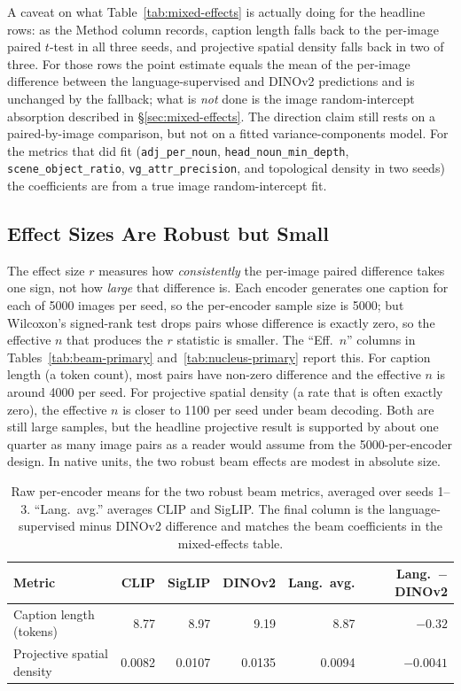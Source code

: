 \documentclass[11pt]{article}
\newcommand{\code}[1]{\texttt{#1}}
\begin{document}
A caveat on what Table~\ref{tab:mixed-effects} is actually doing for the
headline rows: as the Method column records, caption length falls back to the
per-image paired \(t\)-test in all three seeds, and projective spatial density
falls back in two of three. For those rows the point estimate equals the mean
of the per-image difference between the language-supervised and DINOv2
predictions and is unchanged by the fallback; what is \emph{not} done is the
image random-intercept absorption described in \S\ref{sec:mixed-effects}. The
direction claim still rests on a paired-by-image comparison, but not on a
fitted variance-components model. For the metrics that did fit
(\code{adj\_per\_noun}, \code{head\_noun\_min\_depth},
\code{scene\_object\_ratio}, \code{vg\_attr\_precision}, and topological
density in two seeds) the coefficients are from a true image random-intercept
fit.

\subsection{Effect Sizes Are Robust but Small}
\label{sec:magnitudes}

The effect size \(r\) measures how \emph{consistently} the per-image paired
difference takes one sign, not how \emph{large} that difference is. Each
encoder generates one caption for each of 5000 images per seed, so the
per-encoder sample size is 5000; but Wilcoxon's signed-rank test drops pairs
whose difference is exactly zero, so the effective \(n\) that produces the
\(r\) statistic is smaller. The ``Eff.\ \(n\)'' columns in
Tables~\ref{tab:beam-primary} and~\ref{tab:nucleus-primary} report this. For
caption length (a token count), most pairs have non-zero difference and the
effective \(n\) is around 4000 per seed. For projective spatial density (a rate
that is often exactly zero), the effective \(n\) is closer to 1100 per seed
under beam decoding. Both are still large samples, but the headline projective
result is supported by about one quarter as many image pairs as a reader
would assume from the 5000-per-encoder design. In native units, the two
robust beam effects are modest in absolute size.

\begin{table}[!htbp]
\centering
\caption{Raw per-encoder means for the two robust beam metrics, averaged over
seeds 1--3. ``Lang.\ avg.'' averages CLIP and SigLIP. The final column is the
language-supervised minus DINOv2 difference and matches the beam coefficients
in the mixed-effects table.}
\label{tab:raw-means}
\begin{tabular}{@{}lrrrrr@{}}
\toprule
Metric & CLIP & SigLIP & DINOv2 & Lang.\ avg. & Lang.\ \(-\) DINOv2 \\
\midrule
Caption length (tokens) & 8.77 & 8.97 & 9.19 & 8.87 & \(-0.32\) \\
Projective spatial density & 0.0082 & 0.0107 & 0.0135 & 0.0094 & \(-0.0041\) \\
\bottomrule
\end{tabular}
\end{table}
\end{document}
